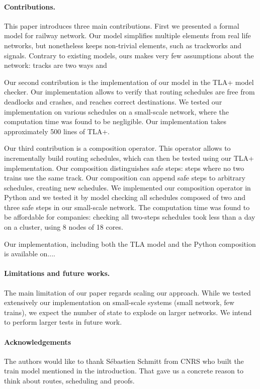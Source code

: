\documentclass[runningheads]{llncs}
\begin{document}
\paragraph{Contributions.}
This paper introduces three main contributions. First we presented a formal model for railway network. Our model simplifies multiple elements from real life networks, but nonetheless keeps non-trivial elements, such as trackworks and signals. Contrary to existing models, ours makes very few assumptions about the network: tracks are two ways and 

Our second contribution is the implementation of our model in the TLA+ model checker. Our implementation allows to verify that routing schedules are free from deadlocks and crashes, and reaches correct destinations. We tested our implementation on various schedules on a small-scale network, where the computation time was found to be negligible. Our implementation takes approximately 500 lines of TLA+.

Our third contribution is a composition operator. This operator allows to incrementally build routing schedules, which can then be tested using our TLA+ implementation. Our composition distinguishes safe steps: steps where no two trains use the same track. Our composition can append safe steps to arbitrary schedules, creating new schedules. We implemented our composition operator in Python and we tested it by model checking all schedules composed of two and three safe steps in our small-scale network. The computation time was found to be affordable for companies: checking all two-steps schedules took less than a day on a cluster, using 8 nodes of 18 cores.

Our implementation, including both the TLA model and the Python composition is available on....

\paragraph{Limitations and future works.}
The main limitation of our paper regards scaling our approach. While we tested extensively our implementation on small-scale systems (small network, few trains), we expect the number of state to explode on larger networks. We intend to perform larger tests in future work.



\paragraph{Acknowledgements} The authors would like to thank Sébastien Schmitt from CNRS who built the train model mentioned in the introduction. That gave us a concrete reason to think about routes, scheduling and proofs. 



\end{document}
